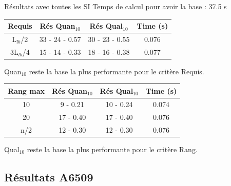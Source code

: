 \documentclass{beamer}
\begin{document}
\begin{frame}{Résultats avec toutes les SI}
Temps de calcul pour avoir la base : 37.5 s

\centering
\begin{tabular}{|c|c|c|c|}
   \hline
   Requis & Rés Quan$_{10}$ & Rés Qual$_{10}$ & Time (s)\\
   \hline
   L$_{lb}$/2 & 33 - 24 - 0.57 & 30 - 23 - 0.55 & 0.076 \\
   \hline
   3L$_{lb}$/4 & 15 - 14 - 0.33 & 18 - 16 - 0.38  & 0.077 \\
   \hline
\end{tabular}

Quan$_{10}$ reste la base la plus performante pour le critère Requis.

\begin{tabular}{|c|c|c|c|}
   \hline
   Rang max & Rés Quan$_{10}$ & Rés Qual$_{10}$ & Time (s)\\
   \hline
   10 & 9 - 0.21 & 10 - 0.24 & 0.074 \\
   \hline
   20 & 17 - 0.40 & 17 - 0.40 & 0.076 \\
   \hline
   n/2 & 12 - 0.30 & 12 - 0.30 & 0.076 \\
   \hline
\end{tabular}

Qual$_{10}$ reste la base la plus performante pour le critère Rang.
\end{frame}

\subsection{Résultats A6509}
\end{document}
